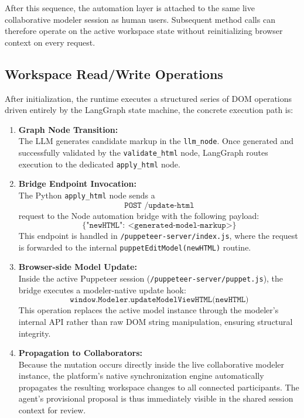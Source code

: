 After this sequence, the automation layer is attached to the same live collaborative modeler session as human users. Subsequent method calls can therefore operate on the active workspace state without reinitializing browser context on every request.

\subsection{Workspace Read/Write Operations}
After initialization, the runtime executes a structured series of DOM operations driven entirely by the LangGraph state machine, the concrete execution path is:

\begin{enumerate}
    \item \textbf{Graph Node Transition:} \\
    The LLM generates candidate markup in the \texttt{llm\_node}. Once generated and successfully validated by the \texttt{validate\_html} node, LangGraph routes execution to the dedicated \texttt{apply\_html} node.

    \item \textbf{Bridge Endpoint Invocation:} \\
    The Python \texttt{apply\_html} node sends a
    \[
    \texttt{POST /update-html}
    \]
    request to the Node automation bridge with the following payload:
    \[
    \{\texttt{"newHTML"}:\ \texttt{<generated-model-markup>}\}
    \]
    This endpoint is handled in \texttt{/puppeteer-server/index.js}, where the request is forwarded to the internal \texttt{puppetEditModel(newHTML)} routine.

    \item \textbf{Browser-side Model Update:} \\
    Inside the active Puppeteer session (\texttt{/puppeteer-server/puppet.js}), the bridge executes a modeler-native update hook:
    \[
    \texttt{window.Modeler.updateModelViewHTML(newHTML)}
    \]
    This operation replaces the active model instance through the modeler's internal API rather than raw DOM string manipulation, ensuring structural integrity.

    \item \textbf{Propagation to Collaborators:} \\
    Because the mutation occurs directly inside the live collaborative modeler instance, the platform's native synchronization engine automatically propagates the resulting workspace changes to all connected participants. The agent's provisional proposal is thus immediately visible in the shared session context for review.
\end{enumerate}

